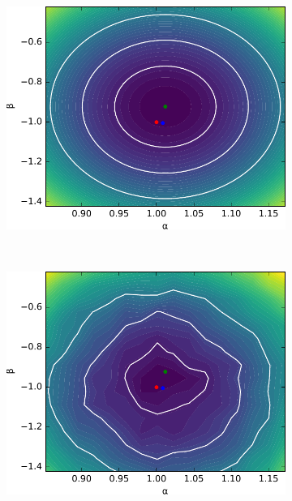 \documentclass[12pt]{article}
\numberwithin{equation}{section}
\theoremstyle{plain}
\begin{document}
\begin{figure}
    \centering
    \begin{subfigure}[t]{0.43\textwidth}
        \centering
        \includegraphics[width=\textwidth]{figures/fig5a.pdf}
        \caption{  }
        \label{fig:5a}
    \end{subfigure}
    ~
    \begin{subfigure}[t]{0.43\textwidth}
        \centering
        \includegraphics[width=\textwidth]{figures/fig5b.pdf}
        \caption{ }
        \label{fig:5b}
    \end{subfigure}


\end{figure}
\end{document}
